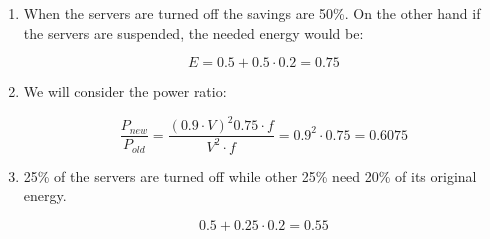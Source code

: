 \begin{acsolution}\end{acsolution}

\begin{enumerate}

\item When the servers are turned off the savings are 50\%. On the other hand
if the servers are suspended, the needed energy would be:

\[E = 0.5 + 0.5 \cdot 0.2 = 0.75\]

\item We will consider the power ratio:

\[
\frac{P_{new}}{P_{old}} =
\frac{(0.9 \cdot V)^2 0.75 \cdot f}{V^2 \cdot f} =
0.9^2 \cdot 0.75 =
0.6075
\]

\item 25\% of the servers are turned off while other 25\% need 20\% of
its original energy.

\[
0.5 + 0.25 \cdot 0.2 = 0.55
\]

\end{enumerate}

